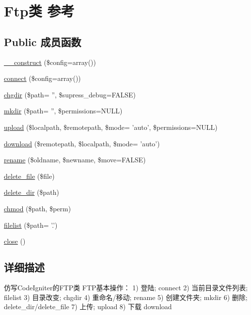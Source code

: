 \hypertarget{classFtp}{\section{Ftp类 参考}
\label{classFtp}
}
\subsection*{Public 成员函数}
\begin{DoxyCompactItemize}
\item 
\hyperlink{classFtp_a6e16a450ba38e9cf178b13ff3e091443}{\+\_\+\+\_\+construct} (\$config=array())
\item 
\hyperlink{classFtp_acbe05ba238542a10c1b0623ecf7d2081}{connect} (\$config=array())
\item 
\hyperlink{classFtp_aade650c29b7b10938c1dd32842cc43f2}{chgdir} (\$path= '', \$supress\+\_\+debug=F\+A\+L\+S\+E)
\item 
\hyperlink{classFtp_ae876a655c13c8418289e5f6751a0b2f1}{mkdir} (\$path= '', \$permissions=N\+U\+L\+L)
\item 
\hyperlink{classFtp_aae84f09cc3a13e23a78e68a91638717e}{upload} (\$localpath, \$remotepath, \$mode= 'auto', \$permissions=N\+U\+L\+L)
\item 
\hyperlink{classFtp_a4c03629438e7c033e09940f14feae8b4}{download} (\$remotepath, \$localpath, \$mode= 'auto')
\item 
\hyperlink{classFtp_a25301a57eceb2091105c29835687c461}{rename} (\$oldname, \$newname, \$move=F\+A\+L\+S\+E)
\item 
\hyperlink{classFtp_a2887ad771ff19eaa0041f8e9db7dfbff}{delete\+\_\+file} (\$file)
\item 
\hyperlink{classFtp_a228bb4211ff78dc6bf6233f528bfffb0}{delete\+\_\+dir} (\$path)
\item 
\hyperlink{classFtp_a8b56d6b41df6e5adc6f68aaec73a8c3e}{chmod} (\$path, \$perm)
\item 
\hyperlink{classFtp_a9f23eba3ee61a3986a872d4f3665afec}{filelist} (\$path= '.')
\item 
\hyperlink{classFtp_a763b8546df21e02e9ead949e4e701803}{close} ()
\end{DoxyCompactItemize}


\subsection{详细描述}
仿写\+Code\+Igniter的\+F\+T\+P类 F\+T\+P基本操作： 1) 登陆; connect 2) 当前目录文件列表; filelist 3) 目录改变; chgdir 4) 重命名/移动; rename 5) 创建文件夹; mkdir 6) 删除; delete\+\_\+dir/delete\+\_\+file 7) 上传; upload 8) 下载 download

